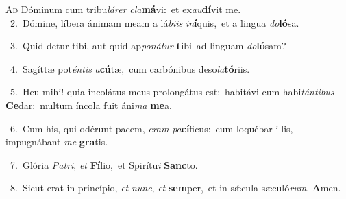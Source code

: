 \lettrine{\initial\textcolor{\initialcolor}{A}}{d} Dóminum cum tribu\-\textit{lá}\-\textit{rer} \textit{cla}\-\textbf{má}vi:~\star et ex\-\textit{au}\-\textbf{dí}vit me.\\
{\numbfont\textcolor{\numbcolor}{~2.}}~Dómine, líbera ánimam meam a lá\-\textit{bi}\-\textit{is} \textit{in}\-\textbf{í}quis,~\star et a lingua \textit{do}\-\textbf{ló}sa.\par
{\numbfont\textcolor{\numbcolor}{~3.}}~Quid detur tibi, aut quid ap\-\textit{po}\-\textit{ná}\textit{tur} \textbf{ti}\-bi~\star ad linguam \textit{do}\-\textbf{ló}sam?\par
{\numbfont\textcolor{\numbcolor}{~4.}}~Sagíttæ pot\-\textit{én}\-\textit{tis} \textit{a}\-\textbf{cú}tæ,~\star cum carbónibus deso\-\textit{la}\-\textbf{tó}riis.\par
{\numbfont\textcolor{\numbcolor}{~5.}}~Heu mihi! quia incolátus meus prolongátus est:~\dagger habitávi cum habi\-\textit{tán}\-\textit{ti}\textit{bus} \textbf{Ce}\-dar:~\star multum íncola fuit áni\textit{ma} \textbf{me}\-a.\par
{\numbfont\textcolor{\numbcolor}{~6.}}~Cum his, qui odérunt pacem, \textit{e}\-\textit{ram} \textit{pa}\-\textbf{cí}ficus:~\star cum loquébar illis, impugnábant \textit{me} \textbf{gra}\-tis.\par
{\numbfont\textcolor{\numbcolor}{~7.}}~Glória \textit{Pa}\-\textit{tri}, \textit{et} \textbf{Fí}\-lio,~\star et Spirítu\textit{i} \textbf{Sanc}\-to.\par
{\numbfont\textcolor{\numbcolor}{~8.}}~Sicut erat in princípio, \textit{et} \textit{nunc}\-, \textit{et} \textbf{sem}\-per,~\star et in sǽcula sæculó\-\textit{rum}\-. \textbf{A}\-men.\par
